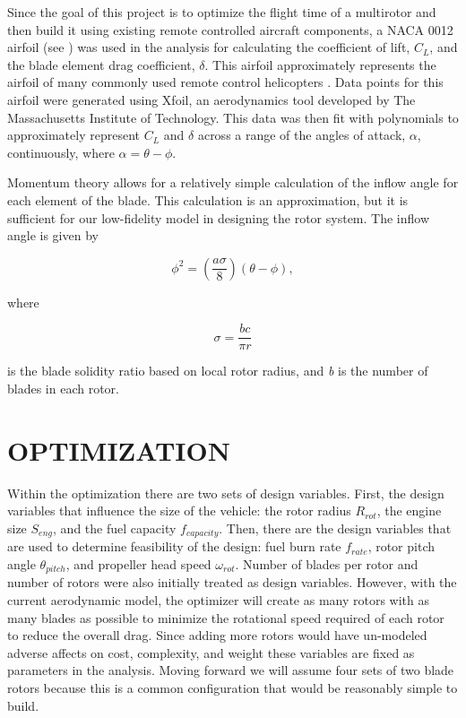 \documentclass[letterpaper, 10 pt, conference]{ieeeconf}  %
\begin{document}
Since the goal of this project is to optimize the flight time of a multirotor and then build it using existing remote controlled aircraft components, a NACA 0012 airfoil (see \cite{abbott1959theory}) was used in the analysis for calculating the coefficient of lift, $C_L$, and the blade element drag coefficient, $\delta$. This airfoil approximately represents the airfoil of many commonly used remote control helicopters \cite{mettler2013identification}. Data points for this airfoil were generated using Xfoil, an aerodynamics tool developed by The Massachusetts Institute of Technology. This data was then fit with polynomials to approximately represent $C_L$ and $\delta$ across a range of the angles of attack, $\alpha$, continuously, where $\alpha = \theta - \phi$. 

Momentum theory allows for a relatively simple calculation of the inflow angle for each element of the blade. This calculation is an approximation, but it is sufficient for our low-fidelity model in designing the rotor system. The inflow angle is given by 

\begin{equation}
\phi^2 = (\frac{a\sigma}{8})(\theta-\phi),
\label{inflow_eqn}
\end{equation}

where 

\[ \sigma = \frac{bc}{\pi r} \]

is the blade solidity ratio based on local rotor radius, and \textit{b} is the number of blades in each rotor. 


\section{OPTIMIZATION}

Within the optimization there are two sets of design variables.  First, the design variables that influence the size of the vehicle: the rotor radius $R_{rot}$, the engine size $S_{eng}$, and the fuel capacity $f_{capacity}$.  Then, there are the design variables that are used to determine feasibility of the design: fuel burn rate $f_{rate}$, rotor pitch angle $\theta_{pitch}$, and propeller head speed $\omega_{rot}$. Number of blades per rotor and number of rotors were also initially treated as design variables. However, with the current aerodynamic model, the optimizer will create as many rotors with as many blades as possible to minimize the rotational speed required of each rotor to reduce the overall drag. Since adding more rotors would have un-modeled adverse affects on cost, complexity, and weight these variables are fixed as parameters in the analysis. Moving forward we will assume four sets of two blade rotors because this is a common configuration that would be reasonably simple to build.
\end{document}
